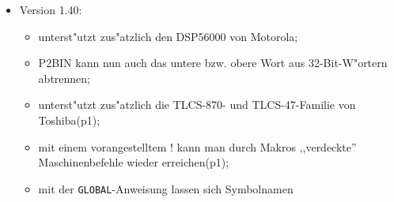 \documentclass[12pt,a4paper,twoside]{report}
\newcommand{\tty}[1]{{\tt #1}}
\begin{document}
\begin{itemize}
{\begin{itemize}
{            Kanal (STDERR) geschrieben (p3);}
      \item{Der beim 6811-Teil fehlende \tty{STOP}-Befehl ist nun da (scusi,p3);}
      \item{unterst"utzt zus"atzlich die $\mu$PD78(C)1x-Familie von NEC (p3);}
      \item{unterst"utzt zus"atzlich den PIC16C84 von Microchip (p3);}
      \item{Kommandozeilenschalter \tty{E}, um die Fehlermeldungen in eine Datei
            umleiten zu k"onnen (p3);}
      \item{Die Unklarheiten im 78(C)1x-Teil sind beseitigt (p4);}
      \item{neben dem MELPS-7700 ist nun auch das ,,Vorbild'' 65816
            vorhanden (p4);}
      \item{Die ST6-Pseudoanweisung \tty{ROMWIN} wurde entfernt und
            mit in den \tty{ASSUME}-Befehl eingegliedert (p4);}
      \item{unterst"utzt zus"atzlich den 6804 von SGS-Thomson (p4);}
      \item{durch die \tty{NOEXPORT}-Option in der Makrodefinition
            kann nun f"ur jedes Makro einzeln festgelegt werden, ob es
            in der MAC-Datei erscheinen soll oder nicht (p4);}
      \item{Die Bedeutung von \tty{MACEXP} f"ur Expansionen von Makros hat
            sich wegen der zus"atzlichen \tty{NOEXPAND}-Option in der
            Makrodefinition leicht ge"andert (p4);}
      \item{Durch die \tty{GLOBAL}-Option in der Makrodefinition k"onnen nun
            zus"atzlich Makros definiert werden, die durch ihren
            Sektionsnamen eindeutig gekennzeichnet sind (p4).}
      \end{itemize}}
\item{Version 1.40:
      \begin{itemize}
      \item{unterst"utzt zus"atzlich den DSP56000 von Motorola;}
      \item{P2BIN kann nun auch das untere bzw. obere Wort aus
            32-Bit-W"ortern abtrennen;}
      \item{unterst"utzt zus"atzlich die TLCS-870- und TLCS-47-Familie
            von Toshiba(p1);}
      \item{mit einem vorangestelltem ! kann man durch Makros
            ,,verdeckte'' Maschinenbefehle wieder erreichen(p1);}
      \item{mit der \tty{GLOBAL}-Anweisung lassen sich Symbolnamen
}
\end{itemize}}
\end{itemize}
\end{document}
